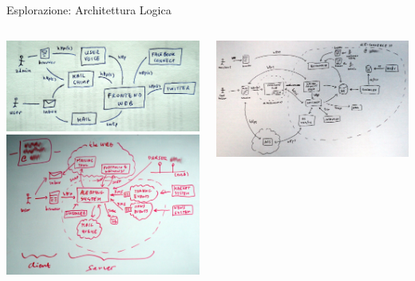 \documentclass[compress, red, 14pt, pdf]{beamer}
\begin{document}
	\begin{frame}{Esplorazione: Architettura Logica}
		\begin{columns}[T]
		    \begin{column}{.5\textwidth}
				\includegraphics[scale=0.13]{images/architecture-2}
				\\ \vspace*{0.2cm}
				\includegraphics[scale=0.135]{images/architecture-3}
		    \end{column}
		    \begin{column}{.5\textwidth}
				\includegraphics[scale=0.13]{images/architecture-5}

\end{column}
\end{columns}
\end{frame}
\end{document}
